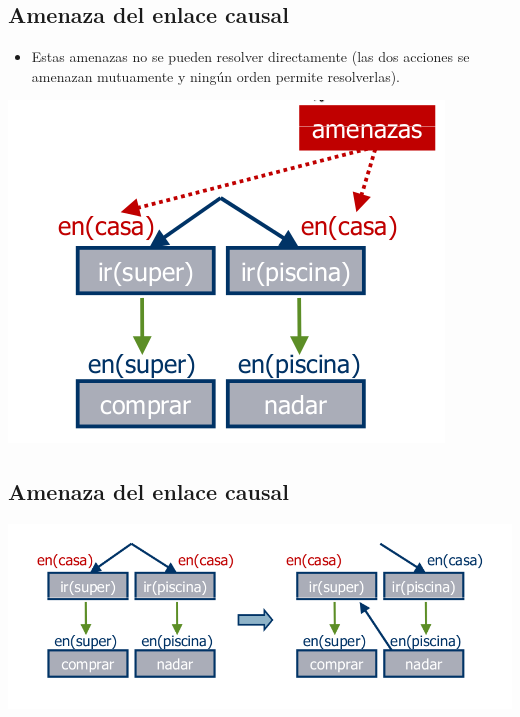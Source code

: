 \documentclass[11pt]{article}
\begin{document}
\subsection*{Amenaza del enlace causal}
\label{sec:org4866c1c}

\begin{itemize}
\item Estas amenazas no se pueden resolver directamente (las dos
acciones se amenazan mutuamente y ningún orden permite
resolverlas).
\end{itemize}

\begin{center}
\includegraphics[width=.9\linewidth]{imagenes/casa.png}
\end{center}

\subsection*{Amenaza del enlace causal}
\label{sec:orga432f42}

\begin{center}
\includegraphics[width=.9\linewidth]{imagenes/solcasa.png}
\end{center}
\end{document}
